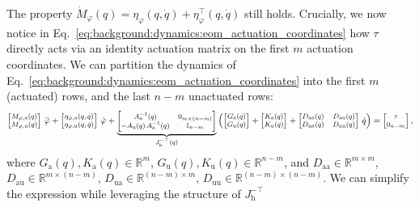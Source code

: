 The property $\dot{M}_\varphi(q) = \eta_\varphi(q,\dot{q}) + \eta^\top_\varphi(q,\dot{q})$ still holds.
Crucially, we now notice in Eq.~\ref{eq:background:dynamics:eom_actuation_coordinates} how $\tau$ directly acts via an identity actuation matrix on the first $m$ actuation coordinates.
%
We can partition the dynamics of Eq.~\ref{eq:background:dynamics:eom_actuation_coordinates} into the first $m$ (actuated) rows, and the last $n-m$ unactuated rows:
\begin{equation}\footnotesize
    \begin{bmatrix}
        M_{\varphi,\mathrm{a}}(q)\\ 
        M_{\varphi,\mathrm{u}}(q)
    \end{bmatrix} \, \ddot{\varphi} + \begin{bmatrix}
        \eta_{\varphi,\mathrm{a}}(q,\dot{q})\\ \eta_{\varphi,\mathrm{u}}(q,\dot{q})
    \end{bmatrix} \, \dot{\varphi} + \underbrace{\begin{bmatrix}
        A_\mathrm{a}^{-1}(q) & 0_{m \times (n-m)}\\
        -A_\mathrm{u}(q) \, A_\mathrm{a}^{-1}(q) & \mathbb{I}_{n-m}
    \end{bmatrix}}_{J_\mathrm{h}^{-\top}(q)} \left ( \begin{bmatrix}
        G_\mathrm{a}(q)\\ G_\mathrm{u}(q)
    \end{bmatrix} + \begin{bmatrix}
        K_\mathrm{a}(q)\\ K_\mathrm{u}(q)
    \end{bmatrix} + \begin{bmatrix}
        D_\mathrm{aa}(q) & D_\mathrm{au}(q)\\ 
        D_\mathrm{ua}(q) & D_\mathrm{uu}(q)
    \end{bmatrix} \, \dot{q} \right ) = \begin{bmatrix}
        \tau\\ 0_{n-m}
    \end{bmatrix},
\end{equation}
where $G_\mathrm{a}(q), K_\mathrm{a}(q) \in \mathbb{R}^{m}$, $G_\mathrm{u}(q), K_\mathrm{u}(q) \in \mathbb{R}^{n-m}$, and $D_\mathrm{aa} \in \mathbb{R}^{m \times m}$, $D_\mathrm{au} \in \mathbb{R}^{m \times (n-m)}$, $D_\mathrm{ua} \in \mathbb{R}^{(n-m) \times m}$, $D_\mathrm{uu} \in \mathbb{R}^{(n-m) \times (n-m)}$.
We can simplify the expression while leveraging the structure of $J_\mathrm{h}^{-\top}$
